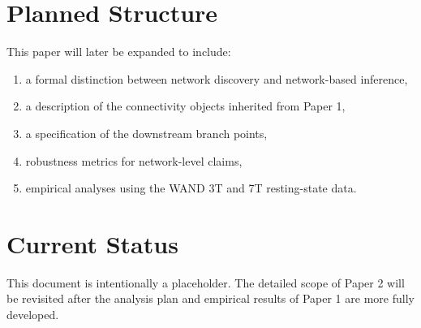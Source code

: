 \documentclass[11pt,a4paper]{article}
\begin{document}
\section{Planned Structure}

This paper will later be expanded to include:

\begin{enumerate}[label=\arabic*.]
    \item a formal distinction between network discovery and network-based inference,
    \item a description of the connectivity objects inherited from Paper 1,
    \item a specification of the downstream branch points,
    \item robustness metrics for network-level claims,
    \item empirical analyses using the WAND 3T and 7T resting-state data.
\end{enumerate}

\section{Current Status}

This document is intentionally a placeholder. The detailed scope of Paper 2 will be revisited after the analysis plan and empirical results of Paper 1 are more fully developed.

\newpage


\end{document}
